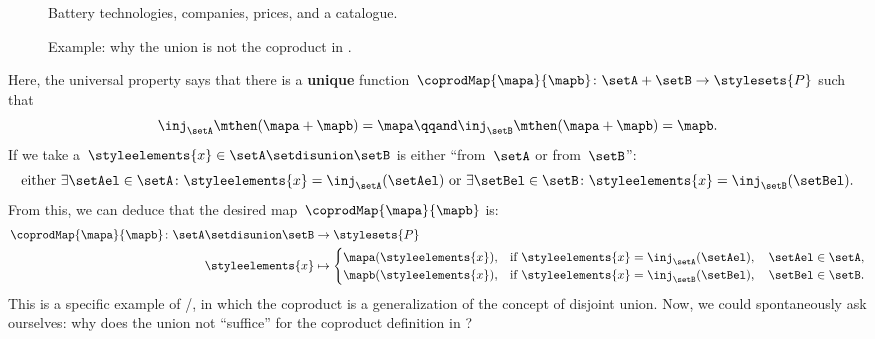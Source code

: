 \begin{example}
	\begin{figure*}[tbh]
		\centering
		\caption{Battery technologies, companies, prices, and a catalogue.}
		\label{fig:coprod_batteries_1}
	\end{figure*}

	\begin{figure*}[tbh]
		\centering
		\caption{Example: why the union is not the coproduct in \Set.}
		\label{fig:coprod_batteries_2}
	\end{figure*}

	Here, the universal property says that there is a \textbf{unique} function~$\coprodMap{\mapa}{\mapb}\colon \setA+\setB\to \stylesets{P}$ such that
	\begin{equation}
		\label{eq:exa-batt-factoring-maps}
		\inj_\setA\mthen (\mapa+ \mapb)=\mapa
		\qqand
		\inj_\setB\mthen (\mapa+ \mapb)=\mapb.
	\end{equation}
	If we take a~$\styleelements{x}\in \setA \setdisunion \setB$ is either ``from~$\setA$ or from~$\setB$'':
	\begin{equation}
		\label{eq:exa-batt-explain-sum-map}
		\text{either } \exists \setAel\in \setA\colon \styleelements{x}=\inj_\setA(\setAel) \text{ or }\exists \setBel\in \setB\colon \styleelements{x}=\inj_\setB(\setBel).
	\end{equation}
	From this, we can deduce that the desired map~$\coprodMap{\mapa}{\mapb}$ is:
	\begin{equation}
		\label{eq:exa-batt-def-sum-map}
		\begin{aligned}
			\coprodMap{\mapa}{\mapb} \colon  \setA \setdisunion \setB & \to \stylesets{P} \\
			\styleelements{x}                                         & \mapsto
			\begin{cases}
				\mapa(\styleelements{x}), & \text{if } \styleelements{x}=\inj_\setA(\setAel),\quad \setAel \in \setA, \\
				\mapb(\styleelements{x}), & \text{if } \styleelements{x}=\inj_\setB(\setBel),\quad \setBel \in \setB.
			\end{cases}
		\end{aligned}
	\end{equation}
	This is a specific example of \Set/\FinSet, in which the coproduct is a generalization of the concept of disjoint union.
	Now, we could spontaneously ask ourselves: why does the union not ``suffice'' for the coproduct definition in \Set?

\end{example}
